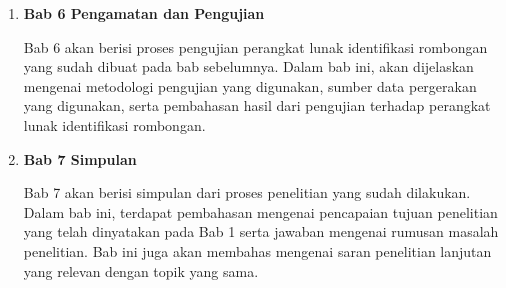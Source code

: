 \begin{enumerate}
    \item \textbf{Bab 6 Pengamatan dan Pengujian}
    
    Bab 6 akan berisi proses pengujian perangkat lunak identifikasi rombongan yang sudah dibuat pada bab sebelumnya. Dalam bab ini, akan dijelaskan mengenai metodologi pengujian yang digunakan, sumber data pergerakan yang digunakan, serta pembahasan hasil dari pengujian terhadap perangkat lunak identifikasi rombongan.
    
    \item \textbf{Bab 7 Simpulan}
    
    Bab 7 akan berisi simpulan dari proses penelitian yang sudah dilakukan. Dalam bab ini, terdapat pembahasan mengenai pencapaian tujuan penelitian yang telah dinyatakan pada Bab 1 serta jawaban mengenai rumusan masalah penelitian. Bab ini juga akan membahas mengenai saran penelitian lanjutan yang relevan dengan topik yang sama.
\end{enumerate}
